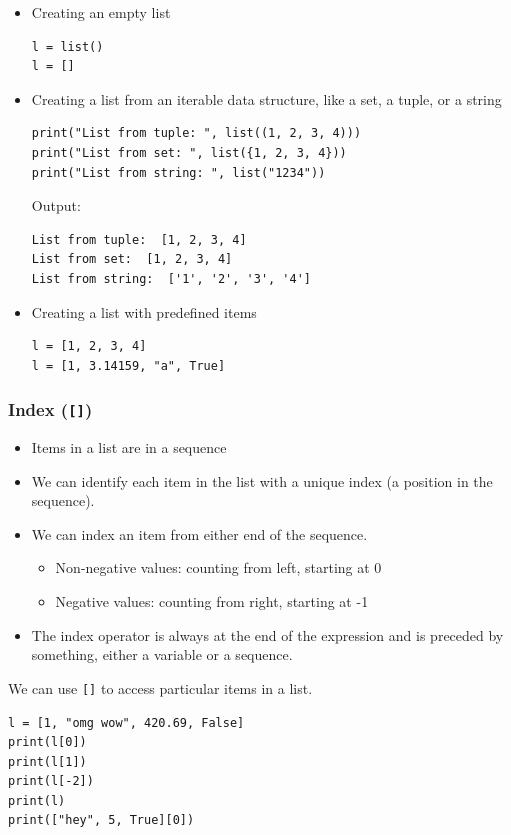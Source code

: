 \documentclass[11pt]{article}
\begin{document}
\begin{itemize}
\item Creating an empty list
\begin{verbatim}
l = list()
l = []
\end{verbatim}

\item Creating a list from an iterable data structure, like a set, a tuple, or a string

\begin{verbatim}
print("List from tuple: ", list((1, 2, 3, 4)))
print("List from set: ", list({1, 2, 3, 4}))
print("List from string: ", list("1234"))
\end{verbatim}

 \noindent Output:

\begin{verbatim}
List from tuple:  [1, 2, 3, 4]
List from set:  [1, 2, 3, 4]
List from string:  ['1', '2', '3', '4']
\end{verbatim}

\item Creating a list with predefined items
\begin{verbatim}
l = [1, 2, 3, 4]
l = [1, 3.14159, "a", True]
\end{verbatim}
\end{itemize}

\subsubsection{Index (\texttt{[]})}
\label{sec:org77ba7e4}
\begin{itemize}
\item Items in a list are in a sequence
\item We can identify each item in the list with a unique index (a position in the sequence).
\item We can index an item from either end of the sequence.
\begin{itemize}
\item Non-negative values: counting from left, starting at 0
\item Negative values: counting from right, starting at -1
\end{itemize}
\item The index operator is always at the end of the expression and is preceded by something, either a variable or a sequence.
\end{itemize}

We can use \texttt{[]} to access particular items in a list.
\begin{verbatim}
l = [1, "omg wow", 420.69, False]
print(l[0])
print(l[1])
print(l[-2])
print(l)
print(["hey", 5, True][0])
\end{verbatim}
\end{document}
